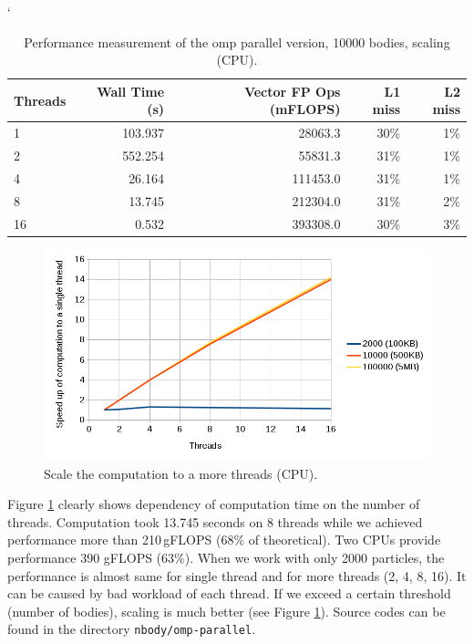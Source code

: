 \begin{table}[ht]
\catcode`
\begin{center}
\begin{tabular}{| l | r | r | r | r |} \hline
\textbf{Threads} & \textbf{Wall Time (s)} & \textbf{Vector FP Ops (mFLOPS)} & \textbf{L1 miss} & \textbf{L2 miss}\\ \hline
1 & 103.937 & 28063.3 & 30\% & 1\%\\ \hline
2 & 552.254 & 55831.3 & 31\% & 1\%\\ \hline
4 & 26.164 & 111453.0 & 31\% & 1\%\\ \hline
8 & 13.745 & 212304.0 & 31\% & 2\%\\ \hline
16 & 0.532 & 393308.0 & 30\% & 3\%\\ \hline
\end{tabular}
\caption{Performance measurement of the omp parallel version, 10000 bodies, scaling (CPU).}
\label{tab:table_nbody_scaling}
\end{center}
\end{table}

\begin{figure}[htbp]
    \centering
    \includegraphics[width=1\linewidth]{fig/nbody_scaling.png}
    \caption{Scale the computation to a more threads (CPU).}
    \label{fig:graph_nbody_scaling}
\end{figure} 

Figure \ref{fig:graph_nbody_scaling} clearly shows dependency of computation time on the number of threads. Computation took 13.745 seconds on 8 threads while we achieved performance more than 210\,gFLOPS (68\% of theoretical). Two CPUs provide performance 390 gFLOPS (63\%). When we work with only 2000 particles, the  performance is almost same for single thread and for more threads (2, 4, 8, 16). It can be caused by bad workload of each thread. If we exceed a certain threshold (number of bodies), scaling is much better (see Figure \ref{fig:graph_nbody_scaling}). Source codes can be found in the directory \texttt{nbody/omp-parallel}.

